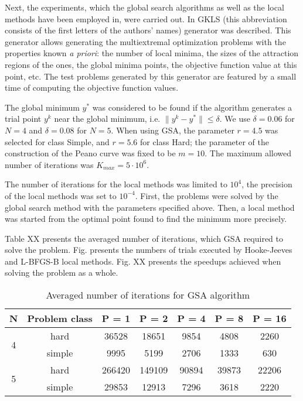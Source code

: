 \documentclass[runningheads]{llncs}
\begin{document}
Next, the experiments, which the global search algorithms as well as the local methods have been employed in, were carried out. In \cite{Gaviano2003} GKLS (this abbreviation consists of the first letters of the authors' names) generator was described. This generator allows generating the multiextremal optimization problems with the properties known \textit{a priori}: the number of local minima, the sizes of the attraction regions of the ones, the global minima points, the objective function value at this point, etc. The test problems generated by this generator are featured by a small time of computing the objective function values.

The global minimum $y^*$ was considered to be found if the algorithm generates a trial point $y^k$ near the global minimum, i.e. $\|y^k -y^*\| \leq \delta$. 
We use $\delta = 0.06$ for $N=4$ and $\delta = 0.08$ for $N=5$.
When using GSA, the parameter $r=4.5$ was selected for class Simple, and $r=5.6$ for class Hard; the parameter of the construction of the Peano curve was fixed to be $m=10$. The maximum allowed number of iterations was $K_{max}= 5\cdot10^6$.

The number of iterations for the local methods was limited to $10^4$, the precision of the local methods was set to $10^{-4}$. First, the problems were solved by the global search method with the parameters specified above. Then, a local method was started from the optimal point found to find the minimum more precisely.

Table XX presents the averaged number of iterations, which GSA required to solve the problem. Fig. presents the numbers of trials executed by Hooke-Jeeves and L-BFGS-B local methods. Fig. XX presents the speedups achieved when solving the problem as a whole.

\begin{table}[ht]
	\caption{Averaged number of iterations for GSA algorithm}
	\label{tab:5}
	\center
	\begin{tabular}{|c|c|c|c|c|c|c|}
		\hline
		N & Problem class & P = 1 & P = 2 & P = 4 & P = 8 & P = 16 \\
		\hline 
		    \multirow{2}{*}{4} & hard & 36528 & 18651 & 9854 & 4808 & 2260 \\ \cline{2-7}
		                       & simple & 9995 & 5199 & 2706 & 1333 & 630 \\
		\hline
		    \multirow{2}{*}{5} & hard & 266420 & 149109 & 90894 & 39873 & 22206 \\ \cline{2-7}
		                       & simple & 29853 & 12913 & 7296 & 3618 & 2220 \\
		\hline
	\end{tabular}
\end{table}
\end{document}
